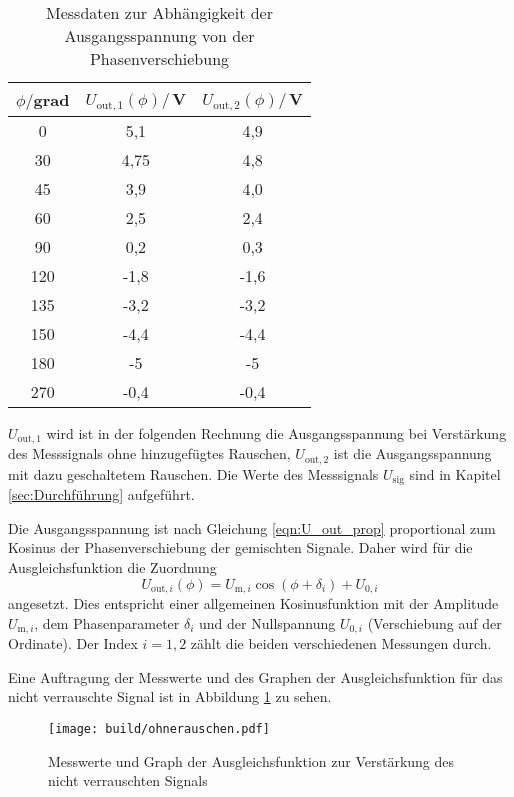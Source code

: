 \begin{table}
\centering
\caption{Messdaten zur Abhängigkeit der Ausgangsspannung von der Phasenverschiebung}
\label{tab:phase}
\begin{tabular}{c c c}
\toprule
$\phi/$grad & $U_\mathrm{out,1}(\phi)/$\,V & $U_\mathrm{out,2}(\phi)/$\,V \\
\midrule
  0	& 5,1	 & 4,9  \\
 30	&	4,75 & 4,8  \\
 45	&	3,9	 & 4,0  \\
 60	&	2,5	 & 2,4  \\
 90	&	0,2	 & 0,3  \\
120 &	-1,8 & -1,6 \\
135 &	-3,2 & -3,2 \\
150 &	-4,4 & -4,4 \\
180 &	-5   & -5   \\
270 &	-0,4 & -0,4 \\
\bottomrule
\end{tabular}
\end{table}

$U_\mathrm{out,1}$ wird ist in der folgenden Rechnung
die Ausgangsspannung bei Verstärkung des Messsignals
ohne hinzugefügtes Rauschen, $U_\mathrm{out,2}$ ist die Ausgangsspannung mit dazu geschaltetem
Rauschen. Die Werte des Messsignals $U_\mathrm{sig}$ sind in Kapitel \ref{sec:Durchführung}
aufgeführt.

Die Ausgangsspannung ist nach Gleichung \eqref{eqn:U_out_prop} proportional zum Kosinus der
Phasenverschiebung der gemischten Signale. Daher wird für die Ausgleichsfunktion
die Zuordnung
\begin{equation}
  U_{\mathrm{out,}i}(\phi) = U_{\mathrm{m,}i} \cos(\phi+\delta_i)+ U_{0,i}
  \label{eqn:fit}
\end{equation}
angesetzt. Dies entspricht einer allgemeinen Kosinusfunktion mit der Amplitude
$U_{\mathrm{m},i}$, dem Phasenparameter $\delta_i$ und der Nullspannung $U_{0,i}$ (Verschiebung
auf der Ordinate). Der Index $i=1,2$ zählt die beiden verschiedenen Messungen durch.

Eine Auftragung der Messwerte und des Graphen der Ausgleichsfunktion für das nicht
verrauschte Signal ist in Abbildung \ref{fig:nichtrausch} zu sehen.

\begin{figure}
  \centering
  \texttt{[image: build/ohnerauschen.pdf]}
  \caption{Messwerte und Graph der Ausgleichsfunktion zur Verstärkung des nicht verrauschten Signals}
  \label{fig:nichtrausch}
\end{figure}


